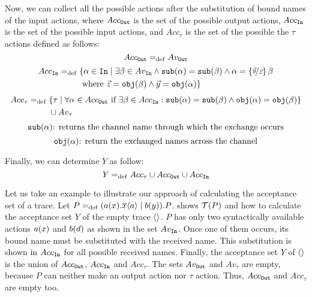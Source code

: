 Now, we can collect all the possible actions after the substitution of bound names of the input actions, where $Acc_{\mathtt{Out}}$ is the set of the possible output actions, $Acc_{\mathtt{In}}$ is the set of the possible input actions, and $Acc_\tau$ is the set of the possible the $\tau$ actions defined as follows:
\[Acc_{\mathtt{Out}} =_{\mathrm{def}} Av_{\mathtt{Out}}\]
\begin{equation*}
\begin{aligned}
Acc_{\mathtt{In}} =_{\mathrm{def}}{} & \{\alpha \in \mathtt{In} \mid \exists \beta \in Av_{\mathtt{In}} \wedge \mathtt{sub}(\alpha)=\mathtt{sub}(\beta) \wedge \alpha=\left\{\nicefrac{\vec{y}}{\vec{z}}\right\}\beta \\
      &  \text{ where } \vec{z}=\mathtt{obj}(\beta) \wedge \vec{y}=\mathtt{obj}(\alpha) \}
\end{aligned}
\end{equation*}
\begin{equation*}
\begin{aligned}
Acc_\tau =_{\mathrm{def}}{} & \{\tau \mid \forall \alpha \in Acc_{\mathtt{Out}} \text{ if } \exists \beta \in Acc_{\mathtt{In}}  :\mathtt{sub}(\alpha)=\mathtt{sub}(\beta) \wedge \mathtt{obj}(\alpha)=\mathtt{obj}(\beta)  \} \\
      &  \cup Av_\tau
\end{aligned}
\end{equation*}
\[\mathtt{sub}(\alpha) \text{: returns the channel name through which the exchange occurs}\]
\[\mathtt{obj}(\alpha) \text{: return the exchanged names across the channel}\]

Finally, we can determine $Y$ as follow:
\[Y =_{\mathrm{def}} Acc_\tau \cup Acc_{\mathtt{Out}} \cup Acc_{\mathtt{In}}\]

Let us take an example to illustrate our approach of calculating the acceptance set of a trace. Let $P=_{\mathrm{def}}(a(x).\overline{x}\langle a\rangle \mid b(y)).P$.   shows $\Traces[P]$ and how to calculate the acceptance set $Y$ of the empty trace $\overline{}\langle\rangle$. $P$ has only two syntactically available actions $a(x)$ and $b(d)$ as shown in the set $Av_{\mathtt{In}}$. Once one of them occurs, its bound name must be substituted with the received name. This substitution is shown in $Acc_{\mathtt{In}}$ for all possible received names. Finally, the acceptance set $Y$ of $\overline{}\langle\rangle$ is the union of $Acc_{\mathtt{Out}}$, $Acc_{\mathtt{In}}$ and $Acc_\tau$. 
The sets $Av_{\mathtt{Out}}$ and $Av_\tau$ are empty, because $P$ can neither make an output action nor $\tau$ action. Thus, $Acc_{\mathtt{Out}}$ and $Acc_\tau$ are empty too.
    
